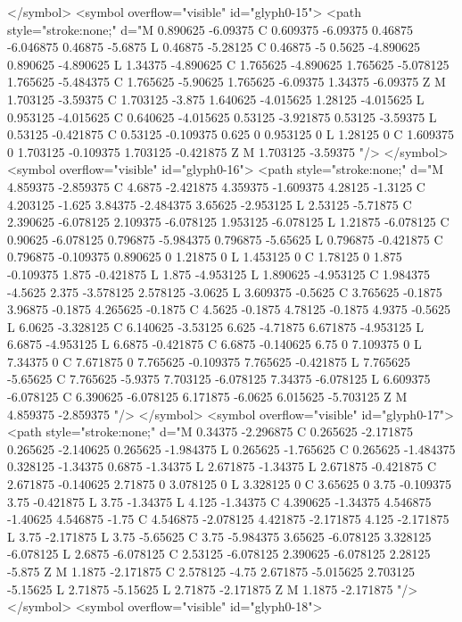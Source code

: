 </symbol>
<symbol overflow="visible" id="glyph0-15">
<path style="stroke:none;" d="M 0.890625 -6.09375 C 0.609375 -6.09375 0.46875 -6.046875 0.46875 -5.6875 L 0.46875 -5.28125 C 0.46875 -5 0.5625 -4.890625 0.890625 -4.890625 L 1.34375 -4.890625 C 1.765625 -4.890625 1.765625 -5.078125 1.765625 -5.484375 C 1.765625 -5.90625 1.765625 -6.09375 1.34375 -6.09375 Z M 1.703125 -3.59375 C 1.703125 -3.875 1.640625 -4.015625 1.28125 -4.015625 L 0.953125 -4.015625 C 0.640625 -4.015625 0.53125 -3.921875 0.53125 -3.59375 L 0.53125 -0.421875 C 0.53125 -0.109375 0.625 0 0.953125 0 L 1.28125 0 C 1.609375 0 1.703125 -0.109375 1.703125 -0.421875 Z M 1.703125 -3.59375 "/>
</symbol>
<symbol overflow="visible" id="glyph0-16">
<path style="stroke:none;" d="M 4.859375 -2.859375 C 4.6875 -2.421875 4.359375 -1.609375 4.28125 -1.3125 C 4.203125 -1.625 3.84375 -2.484375 3.65625 -2.953125 L 2.53125 -5.71875 C 2.390625 -6.078125 2.109375 -6.078125 1.953125 -6.078125 L 1.21875 -6.078125 C 0.90625 -6.078125 0.796875 -5.984375 0.796875 -5.65625 L 0.796875 -0.421875 C 0.796875 -0.109375 0.890625 0 1.21875 0 L 1.453125 0 C 1.78125 0 1.875 -0.109375 1.875 -0.421875 L 1.875 -4.953125 L 1.890625 -4.953125 C 1.984375 -4.5625 2.375 -3.578125 2.578125 -3.0625 L 3.609375 -0.5625 C 3.765625 -0.1875 3.96875 -0.1875 4.265625 -0.1875 C 4.5625 -0.1875 4.78125 -0.1875 4.9375 -0.5625 L 6.0625 -3.328125 C 6.140625 -3.53125 6.625 -4.71875 6.671875 -4.953125 L 6.6875 -4.953125 L 6.6875 -0.421875 C 6.6875 -0.140625 6.75 0 7.109375 0 L 7.34375 0 C 7.671875 0 7.765625 -0.109375 7.765625 -0.421875 L 7.765625 -5.65625 C 7.765625 -5.9375 7.703125 -6.078125 7.34375 -6.078125 L 6.609375 -6.078125 C 6.390625 -6.078125 6.171875 -6.0625 6.015625 -5.703125 Z M 4.859375 -2.859375 "/>
</symbol>
<symbol overflow="visible" id="glyph0-17">
<path style="stroke:none;" d="M 0.34375 -2.296875 C 0.265625 -2.171875 0.265625 -2.140625 0.265625 -1.984375 L 0.265625 -1.765625 C 0.265625 -1.484375 0.328125 -1.34375 0.6875 -1.34375 L 2.671875 -1.34375 L 2.671875 -0.421875 C 2.671875 -0.140625 2.71875 0 3.078125 0 L 3.328125 0 C 3.65625 0 3.75 -0.109375 3.75 -0.421875 L 3.75 -1.34375 L 4.125 -1.34375 C 4.390625 -1.34375 4.546875 -1.40625 4.546875 -1.75 C 4.546875 -2.078125 4.421875 -2.171875 4.125 -2.171875 L 3.75 -2.171875 L 3.75 -5.65625 C 3.75 -5.984375 3.65625 -6.078125 3.328125 -6.078125 L 2.6875 -6.078125 C 2.53125 -6.078125 2.390625 -6.078125 2.28125 -5.875 Z M 1.1875 -2.171875 C 2.578125 -4.75 2.671875 -5.015625 2.703125 -5.15625 L 2.71875 -5.15625 L 2.71875 -2.171875 Z M 1.1875 -2.171875 "/>
</symbol>
<symbol overflow="visible" id="glyph0-18">
